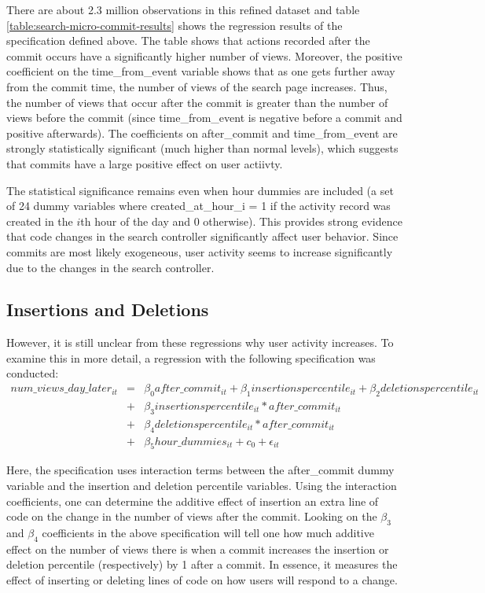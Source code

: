 \documentclass[10pt]{article}
\begin{document}
There are about 2.3 million observations in this refined dataset and table \ref{table:search-micro-commit-results} shows the regression results of the specification defined above. The table shows that actions recorded after the commit occurs have a significantly higher number of views. Moreover, the positive coefficient on the time\_from\_event variable shows that as one gets further away from the commit time, the number of views of the search page increases. Thus, the number of views that occur after the commit is greater than the number of views before the commit (since time\_from\_event is negative before a commit and positive afterwards). The coefficients on after\_commit and time\_from\_event are strongly statistically significant (much higher than normal levels), which suggests that commits have a large positive effect on user actiivty. 

The statistical significance remains even when hour dummies are included (a set of 24 dummy variables where created\_at\_hour\_i = 1 if the activity record was created in the $i$th hour of the day and 0 otherwise). This provides strong evidence that code changes in the search controller significantly affect user behavior. Since commits are most likely exogeneous, user activity seems to increase significantly due to the changes in the search controller. 

\subsection{Insertions and Deletions}

However, it is still unclear from these regressions why user activity increases. To examine this in more detail, a regression with the following specification was conducted:
\begin{eqnarray}
num\_views\_day\_later_{it} &=& \beta_0 after\_commit_{it} + \beta_1 insertionspercentile_{it} + \beta_2 deletionspercentile_{it} \\ \nonumber
&+& \beta_3 insertionspercentile_{it} * after\_commit_{it} \\ \nonumber
&+& \beta_4 deletionspercentile_{it} * after\_commit_{it} \\ \nonumber
&+& \beta_5 hour\_dummies_{it} + c_0 +  \epsilon_{it}
\end{eqnarray}

Here, the specification uses interaction terms between the after\_commit dummy variable and the insertion and deletion percentile variables. Using the interaction coefficients, one can determine the additive effect of insertion an extra line of code on the change in the number of views after the commit. Looking on the $\beta_3$ and $\beta_4$ coefficients in the above specification will tell one how much additive effect on the number of views there is when a commit increases the insertion or deletion percentile (respectively) by 1 after a commit. In essence, it measures the effect of inserting or deleting lines of code on how users will respond to a change.  
\end{document}
